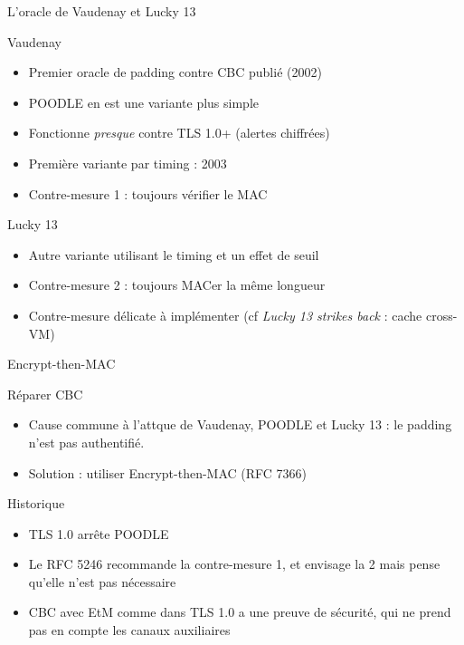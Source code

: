 \documentclass{mpg-ep-slides}
\begin{document}
\begin{frame}{L'oracle de Vaudenay et Lucky 13}
  \begin{block}{Vaudenay}
    \begin{itemize}
      \item Premier oracle de padding contre CBC publié (2002)
      \item POODLE en est une variante plus simple
      \item Fonctionne \emph{presque} contre TLS 1.0+ (alertes chiffrées)
      \item Première variante par timing : 2003
      \item Contre-mesure 1 : toujours vérifier le MAC
    \end{itemize}
  \end{block}

  \begin{block}{Lucky 13}
    \begin{itemize}
      \item Autre variante utilisant le timing et un effet de seuil
      \item Contre-mesure 2 : toujours MACer la même longueur
      \item Contre-mesure délicate à implémenter
        (cf \emph{Lucky 13 strikes back} : cache cross-VM)
    \end{itemize}
  \end{block}
\end{frame}

\begin{frame}{Encrypt-then-MAC}
  \begin{block}{Réparer CBC}
    \begin{itemize}
      \item Cause commune à l'attque de Vaudenay, POODLE et Lucky 13 : le
        padding n'est pas authentifié.
      \item Solution : utiliser Encrypt-then-MAC (RFC 7366)
    \end{itemize}
  \end{block}

  \begin{block}{Historique}
    \begin{itemize}
      \item TLS 1.0 arrête POODLE
      \item Le RFC 5246 recommande la contre-mesure 1, et envisage la 2 mais
        pense qu'elle n'est pas nécessaire
      \item CBC avec EtM comme dans TLS 1.0 a une preuve de sécurité, qui ne
        prend pas en compte les canaux auxiliaires
    \end{itemize}
  \end{block}
\end{frame}
\end{document}
